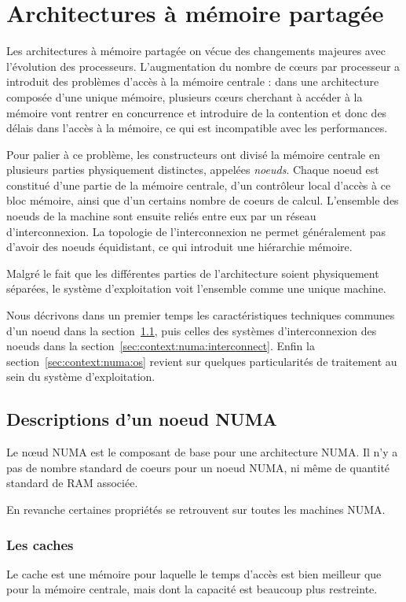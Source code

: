 \section{Architectures à mémoire partagée}\label{sec:context:numa}

Les architectures à mémoire partagée on vécue des changements majeures avec l'évolution des processeurs.
L'augmentation du nombre de cœurs par processeur a introduit des problèmes d'accès à la mémoire centrale : dans une architecture composée d'une unique mémoire, plusieurs cœurs cherchant à accéder à la mémoire vont rentrer en concurrence et introduire de la contention et donc des délais dans l'accès à la mémoire, ce qui est incompatible avec les performances.

Pour palier à ce problème, les constructeurs ont divisé la mémoire centrale en plusieurs parties physiquement distinctes, appelées \emph{noeuds}.
Chaque noeud est constitué d'une partie de la mémoire centrale, d'un contrôleur local d'accès à ce bloc mémoire, ainsi que d'un certains nombre de coeurs de calcul.
L'ensemble des noeuds de la machine sont ensuite reliés entre eux par un réseau d'interconnexion.
La topologie de l'interconnexion ne permet généralement pas d'avoir des noeuds équidistant, ce qui introduit une hiérarchie mémoire.

Malgré le fait que les différentes parties de l'architecture soient physiquement séparées, le système d'exploitation voit l'ensemble comme une unique machine.

Nous décrivons dans un premier temps les caractéristiques techniques communes d'un noeud dans la section~\ref{sec:context:numa:node}, puis celles des systèmes d'interconnexion des noeuds dans la section~\ref{sec:context:numa:interconnect}.
Enfin la section~\ref{sec:context:numa:os} revient sur quelques particularités de traitement au sein du système d'exploitation.

\subsection{Descriptions d'un noeud NUMA}\label{sec:context:numa:node}

Le nœud NUMA est le composant de base pour une architecture NUMA.
Il n'y a pas de nombre standard de coeurs pour un noeud NUMA, ni même de quantité standard de RAM associée.

En revanche certaines propriétés se retrouvent sur toutes les machines NUMA.

\subsubsection{Les caches}
Le cache est une mémoire pour laquelle le temps d'accès est bien meilleur que pour la mémoire centrale, mais dont la capacité est beaucoup plus restreinte.

